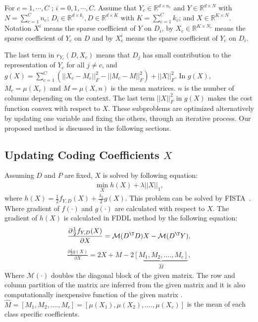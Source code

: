For $c = 1, \cdots,C$ ; $i =0,1,\cdots, C$. Assume that $Y_c \in \mathbb{R}^{d\times n_c}$ and $Y \in \mathbb{R}^{d \times N}$ with $N = \sum_{c=1}^{C}n_c$; $D_i \in \mathbb{R}^{d\times k_i} , D \in \mathbb{R}^{d\times K}\text{ with } K = \sum_{c=1}^{C}k_c $; and $X \in \mathbb{R}^{K \times N}$. Notation $X^i$ means the sparse coefficient of $Y$ on $D_i$, by $X_c \in \mathbb{R}^{K \times N_c}$ means the sparse coefficient of $Y_c$ on $D$ and by $X_c^i$ means the sparse coefficient of $Y_c$ on $D_i$.  

The last term in $r_{Y_c}(D,X_c)$ means that $D_j$ has small contribution to the representation of $Y_c$ for all $j\neq c$, and $g(X) = \sum_{c=1}^{C}(||X_c - M_c||_F^2 - ||M_c - M||_F^2) + ||X||_F^2 $. In $g(X)$, 
$M_c = \mu(X_c)$ and $M = \mu(X,n)$ is the mean matrices. $n$ is the number of columns depending on the context. The last term $||X||_F^2$ in $g(X)$ makes the cost function convex with respect to $X$. These subproblems are optimized alternatively by updating one variable and fixing the others, through an iterative process. Our proposed method is discussed in the following sections.

\subsection*{Updating Coding Coefficients $X$}

Assuming $D$ and $P$ are fixed, $X$ is solved by following equation:
\begin{equation}
\begin{aligned}
\min_X h(X) + \lambda ||X||_1,
\end{aligned}
\label{eq:DLX}
\end{equation}
where $h(X) = \frac{1}{2}f_{Y,D}(X) + \frac{\lambda_2}{2}g(X)$. This problem can be solved by FISTA~\cite{beck2009fast}. Where gradient of $f(\cdot)$ and $g(\cdot)$ are calculated with respect to $X$.
The gradient of $h(X)$ is calculated in FDDL method by the following equation: 
\begin{equation}
\begin{aligned}
\frac{\partial \frac{1}{2}f_{Y,D}(X)}{\partial X} = \mathcal{M}(D^\T D)X - \mathcal{M}(D^\T Y),
\end{aligned}
\label{eq:GRAD1}
\end{equation}
\begin{equation}
\begin{aligned}
\frac{\partial \frac{1}{2}g(X)}{\partial X} = 2X + M -2\underbrace{[M_1, M_2 ,.... , M_c]}_{\widehat{M}},
\end{aligned}
\label{eq:GRAD21}
\end{equation}
Where $\mathcal{M(\cdot)}$ doubles the diagonal block of the given matrix. The row and column partition of the matrix are inferred from the given matrix and it is also computationally inexpensive function of the given matrix . $\widehat{M}=[M_1, M_2 ,.... , M_c] = [\mu(X_1), \mu(X_2) ,.... , \mu(X_c)]$ is the mean of each class specific coefficients.

